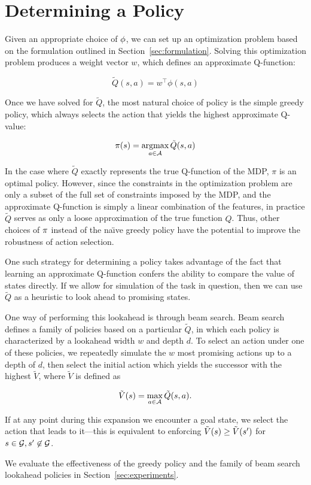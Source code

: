 \section{Determining a Policy}

Given an appropriate choice of $\phi{}$, we can set up an optimization
problem based on the formulation outlined in
Section~\ref{sec:formulation}. Solving this optimization problem produces a
weight vector $w$, which defines an approximate Q-function:

\begin{equation}
  \tilde{Q}(s,a) = w^\intercal \phi(s,a)
\end{equation}


Once we have solved for $\tilde{Q}$, the most natural choice of policy is the
simple greedy policy, which always selects the action that yields the highest
approximate Q-value:

\begin{equation}
  \pi(s) = \operatorname*{argmax}_{a \in \mathcal{A}} \tilde{Q}(s,a)
\end{equation}

In the case where $\tilde{Q}$ exactly represents the true Q-function of the MDP,
$\pi$ is an optimal policy. However, since the constraints in the optimization
problem are only a subset of the full set of constraints imposed by the MDP, and
the approximate Q-function is simply a linear combination of the features, in
practice $\tilde{Q}$ serves as only a loose approximation of the true function
$Q$. Thus, other choices of $\pi{}$ instead of the na\"{\i}ve greedy
policy have the potential to improve the robustness of action selection.

One such strategy for determining a policy takes advantage of the fact that
learning an approximate Q-function confers the ability to compare the value of
states directly. If we allow for simulation of the task in question, then we can
use $\tilde{Q}$ as a heuristic to look ahead to promising states.

One way of performing this lookahead is through beam search. Beam search defines
a family of policies based on a particular $\tilde{Q}$, in which each policy is
characterized by a lookahead width $w$ and depth $d$. To select an action under
one of these policies, we repeatedly simulate the $w$ most promising actions up
to a depth of $d$, then select the initial action which yields the successor
with the highest $\tilde{V}$, where $\tilde{V}$ is defined as

\begin{equation}
  \tilde{V}({s}) = \max_{a \in \mathcal{A}} \tilde{Q}({s}, a).
\end{equation}


If at any point during this expansion we encounter a goal state, we select the
action that leads to it---this is equivalent to enforcing
$\tilde{V}({s}{}) \geq \tilde{V}({s}{}')$ for ${s}{} \in
\mathcal{G}{}, {s}{}' \not\in \mathcal{G}{}$.

We evaluate the effectiveness of the greedy policy and the family of beam search
lookahead policies in Section~\ref{sec:experiments}.
